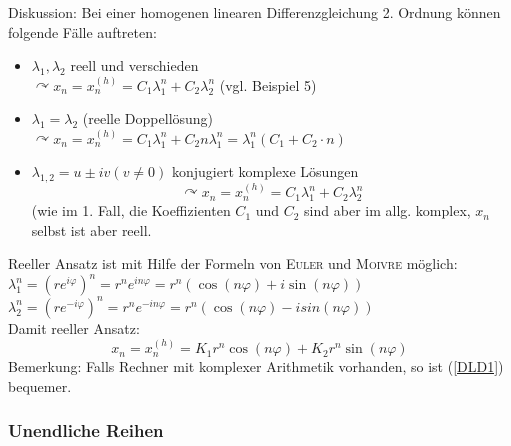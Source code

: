 \documentclass[a4paper]{scrartcl}
\begin{document}
Diskussion: Bei einer homogenen linearen Differenzgleichung 2. Ordnung können folgende Fälle auftreten:
\begin{itemize}
\item $\lambda_1 , \lambda_2$ reell und verschieden\\
$\curvearrowright x_n = x_n^{(h)} = C_1 \lambda_1^n + C_2 \lambda_2^n$ (vgl. Beispiel 5)\\
\item $\lambda_1 = \lambda_2$ (reelle Doppellösung)\\
$\curvearrowright x_n = x_n^{(h)} = C_1 \lambda_1^n + C_2 n \lambda_1^n = \lambda_1^n (C_1 + C_2 \cdot n)$
\item $\lambda_{1,2} = u \pm iv (v \neq 0 )$ konjugiert komplexe Lösungen\\
\begin{equation}\label{DLD1} 
\curvearrowright x_n = x_n^{(h)} = C_1 \lambda_1^n + C_2 \lambda_2^n
\end{equation}
(wie im 1. Fall, die Koeffizienten $C_1 \text{ und } C_2$ sind aber im allg. komplex, $x_n$ selbst ist aber reell.
\end{itemize}

Reeller Ansatz ist mit Hilfe der Formeln von \textsc{Euler} und \textsc{Moivre} möglich:\\
$\lambda_1^n = (r e^{i \varphi})^n = r^n e^{in\varphi} = r^n(\cos{(n\varphi)} + i \sin{(n \varphi)})$\\
$\lambda_2^n = (r e^{-i \varphi})^n = r^n e^{-in\varphi} = r^n(\cos{(n\varphi)} - i sin{(n \varphi)})$\\
Damit reeller Ansatz:
\begin{equation}\label{DLD2}
x_n = x_n^{(h)} = K_1 r^n \cos{(n \varphi)} + K_2 r^n \sin{(n \varphi)}
\end{equation}
Bemerkung: Falls Rechner mit komplexer Arithmetik vorhanden, so ist (\ref{DLD1}) bequemer.

\subsubsection{Unendliche Reihen}
\end{document}
